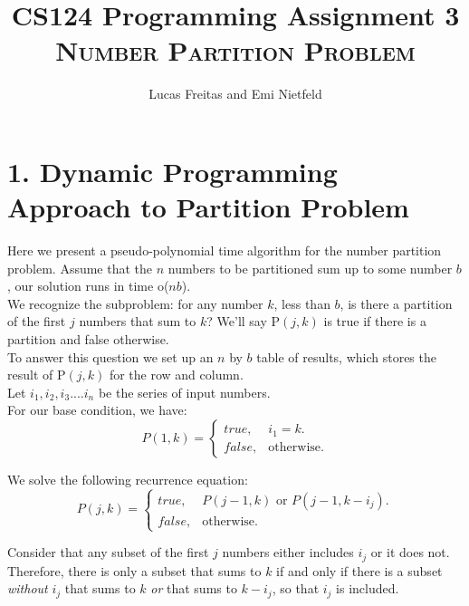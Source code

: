 \documentclass{article}
\begin{document}
\title{CS124 Programming Assignment 3\\\textsc{Number Partition Problem}}
\author{Lucas Freitas and Emi Nietfeld}

\maketitle

\thispagestyle{empty}

\section*{1. Dynamic Programming Approach to Partition Problem}

Here we present a pseudo-polynomial time algorithm for the number partition problem. Assume that the $n$ numbers to be partitioned sum up to some number $b$, our solution runs in time o($nb$).\\

We recognize the subproblem: for any number $k$, less than $b$, is there a partition of the first $j$ numbers that sum to $k$? We'll say P$(j, k)$ is true if there is a partition and false otherwise.\\

To answer this question we set up an $n$ by $b$ table of results, which stores the result of P$(j, k)$ for the row and column.\\

Let $i_1, i_2, i_3.... i_n$ be the series of input numbers.\\ 

For our base condition, we have:\\
\[
P(1, k)=
\begin{cases}
    true, &  i_1 = k.\\
    false, & \text{otherwise}.
\end{cases}
\]

We solve the following recurrence equation: \\
\[
P(j, k)=
\begin{cases}
    true, &  P(j-1, k) \text{ or } P(j-1, k - i_{j}).\\
    false, & \text{otherwise}.
  \end{cases}
\]
  
 Consider that any subset of the first $j$ numbers either includes $i_j$ or it does not. Therefore, there is only a subset that sums to $k$ if  and only if there is a subset \emph{without} $i_j$ that sums to $k$ \emph{or} that sums to $k - i_j$, so that $i_j$ is included. \\
\end{document}
